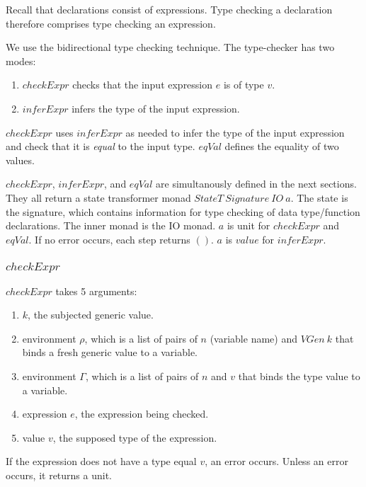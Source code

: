 \documentclass[acmsmall]{acmart}
\begin{document}
Recall that declarations consist of expressions. Type checking a declaration therefore comprises type checking an expression. 

We use the bidirectional type checking technique. The type-checker has two modes:

\begin{enumerate}
  \item $checkExpr$ checks that the input expression $e$ is of type $v$.
  \item $inferExpr$ infers the type of the input expression.
\end{enumerate}

$checkExpr$ uses $inferExpr$ as needed to infer the type of the input expression and check that it is \textit{equal} to the input type. $eqVal$ defines the equality of two values.

$checkExpr$, $inferExpr$, and $eqVal$ are simultanously defined in the next sections. They all return a state transformer monad $StateT \: Signature \: IO \: a$. The state is the signature, which contains information for type checking of data type/function declarations. The inner monad is the IO monad. $a$ is unit for $checkExpr$ and $eqVal$. If no error occurs, each step returns $()$. $a$ is $value$ for $inferExpr$.

\subsubsection{$checkExpr$}
\label{sec:checkExpr}

$checkExpr$ takes 5 arguments:

\begin{enumerate}
  \item $k$, the subjected generic value.
  \item environment $\rho$, which is a list of pairs of $n$ (variable name) and $VGen \: k$ that binds a fresh generic value to a variable.
  \item environment $\Gamma$, which is a list of pairs of $n$ and $v$ that binds the type value to a variable.
  \item expression $e$, the expression being checked.
  \item value $v$, the supposed type of the expression.
\end{enumerate}

If the expression does not have a type equal $v$, an error occurs. Unless an error occurs, it returns a unit.
\end{document}
